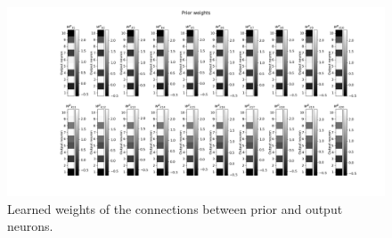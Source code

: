 \begin{figure}
  \includegraphics[width=\linewidth]{figures/horvertAdaptiveInh/priorWeights.png}
  \caption{ Learned weights of the connections between prior and output neurons. }
  \label{fig:horvertAdaptiveInhibitionpriorWeights}
\end{figure}

